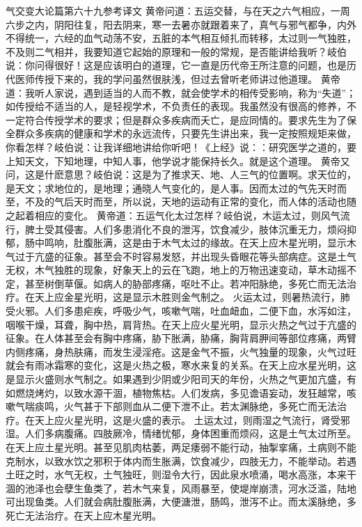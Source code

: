 \documentclass[a4paper,12pt,UTF8,twoside]{ctexbook}
\begin{document}
气交变大论篇第六十九参考译文
黄帝问道：五运交替，与在天之六气相应，一周六步之内，阴阳往复，阳去阴来，寒一去暑亦就跟着来了，真气与邪气都争，内外不得统一，六经的血气动荡不安，五脏的本气相互倾扎而转移，太过则一气独胜，不及则二气相并，我要知道它起始的原理和一般的常规，是否能讲给我听？岐伯说：你问得很好！这是应该明白的道理，它一直是历代帝王所注意的问题，也是历代医师传授下来的，我的学问虽然很肤浅，但过去曾听老师讲过他道理。
黄帝道：我听人家说，遇到适当的人而不教，就会使学术的相传受影响，称为“失道”；如传授给不适当的人，是轻视学术，不负责任的表现。我虽然没有很高的修养，不一定符合传授学术的要求；但是群众多疾病而夭亡，是应同情的。要求先生为了保全群众多疾病的健康和学术的永远流传，只要先生讲出来，我一定按照规矩来做，你看怎样？岐伯说：让我详细地讲给你听吧！《上经》说：：研究医学之道的，要上知天文，下知地理，中知人事，他学说才能保持长久。就是这个道理。
黄帝又问，这是什麽意思？岐伯说：这是为了推求天、地、人三气的位置啊。求天位的，是天文；求地位的，是地理；通晓人气变化的，是人事。因而太过的气先天时而至，不及的气后天时而至，所以说，天地的运动有正常的变化，而人体的活动也随之起着相应的变化。
黄帝道：五运气化太过怎样？岐伯说，木运太过，则风气流行，脾土受其侵害。人们多患消化不良的泄泻，饮食减少，肢体沉重无力，烦闷抑郁，肠中鸣响，肚腹胀满，这是由于木气太过的缘故。在天上应木星光明，显示木气过于亢盛的征象。甚至会不时容易发怒，并出现头昏眼花等头部病症。这是土气无权，木气独胜的现象，好象天上的云在飞跑，地上的万物迅速变动，草木动摇不定，甚至树倒草偃。如病人的胁部疼痛，呕吐不止。若冲阳脉绝，多死亡而无法治疗。在天上应金星光明，这是显示木胜则金气制之。
火运太过，则暑热流行，肺受火邪。人们多患疟疾，呼吸少气，咳嗽气喘，吐血衄血，二便下血，水泻如注，咽喉干燥，耳聋，胸中热，肩背热。在天上应火星光明，显示火热之气过于亢盛的征象。在人体甚至会有胸中疼痛，胁下胀满，胁痛，胸背肩胛间等部位疼痛，两臂内侧疼痛，身热肤痛，而发生浸淫疮。这是金气不振，火气独量的现象，火气过旺就会有雨冰霜寒的变化，这是火热之极，寒水来复的关系。在天上应水星光明，这是显示火盛则水气制之。如果遇到少阴或少阳司天的年份，火热之气更加亢盛，有如燃烧烤灼，以致水源干涸，植物焦枯。人们发病，多见谵语妄动，发狂越常，咳嗽气喘痰鸣，火气甚于下部则血从二便下泄不止。若太渊脉绝，多死亡而无法治疗。在天上应火星光明，这是火盛的表示。
土运太过，则雨湿之气流行，肾受邪湿。人们多病腹痛。四肢厥冷，情绪忧郁，身体困重而烦闷，这是土气太过所至。在天上应土星光明。甚至见肌肉枯萎，两足痿弱不能行动，抽掣挛痛，土病则不能克制水，以致水饮之邪积于体内而生胀满，饮食减少，四肢无力，不能举动。若遇土旺之时，水气无权，土气独旺，则湿令大行，因此泉水喷涌，喝水高涨，本来干涸的池泽也会孽生鱼类了，若木气来复，风雨暴至，使堤岸崩溃，河水泛滥，陆地可出现鱼类。人们就会病肚腹胀满，大便溏泄，肠鸣，泄泻不止。而太溪脉绝，多死亡无法治疗。在天上应木星光明。
\end{document}
